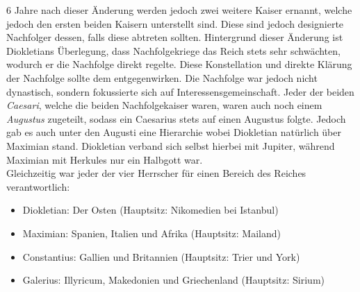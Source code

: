\documentclass{article}
\begin{document}
	6 Jahre nach dieser Änderung werden jedoch zwei weitere Kaiser ernannt, welche jedoch den ersten beiden Kaisern unterstellt sind. Diese sind jedoch designierte Nachfolger dessen, falls diese abtreten sollten. Hintergrund dieser Änderung ist Diokletians Überlegung, dass Nachfolgekriege das Reich stets sehr schwächten, wodurch er die Nachfolge direkt regelte. Diese Konstellation und direkte Klärung der Nachfolge sollte dem entgegenwirken. Die Nachfolge war jedoch nicht dynastisch, sondern fokussierte sich auf Interessensgemeinschaft. Jeder der beiden \textit{Caesari}, welche die beiden Nachfolgekaiser waren, waren auch noch einem \textit{Augustus} zugeteilt, sodass ein Caesarius stets auf einen Augustus folgte. Jedoch gab es auch unter den Augusti eine Hierarchie wobei Diokletian natürlich über Maximian stand. Diokletian verband sich selbst hierbei mit Jupiter, während Maximian mit Herkules nur ein Halbgott war. \\
	Gleichzeitig war jeder der vier Herrscher für einen Bereich des Reiches verantwortlich:
	\begin{itemize}
		\item{Diokletian: Der Osten (Hauptsitz: Nikomedien bei Istanbul)}
		\item{Maximian: Spanien, Italien und Afrika (Hauptsitz: Mailand)}
		\item{Constantius: Gallien und Britannien (Hauptsitz: Trier und York)}
		\item{Galerius: Illyricum, Makedonien und Griechenland (Hauptsitz: Sirium)}
	\end{itemize}
\end{document}
